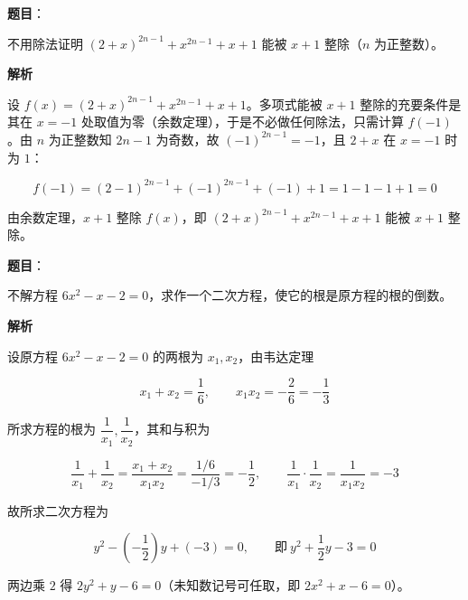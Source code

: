 

\begin{answer}

\textbf{题目}：

不用除法证明 $(2+x)^{2n-1}+x^{2n-1}+x+1$ 能被 $x+1$ 整除（$n$ 为正整数）。

\textbf{解析}

设 $f(x)=(2+x)^{2n-1}+x^{2n-1}+x+1$。多项式能被 $x+1$ 整除的充要条件是其在 $x=-1$ 处取值为零（余数定理），于是不必做任何除法，只需计算 $f(-1)$。由 $n$ 为正整数知 $2n-1$ 为奇数，故 $(-1)^{2n-1}=-1$，且 $2+x$ 在 $x=-1$ 时为 $1$：

\nopagebreak[4]
\[
f(-1)=(2-1)^{2n-1}+(-1)^{2n-1}+(-1)+1=1-1-1+1=0
\]

由余数定理，$x+1$ 整除 $f(x)$，即 $(2+x)^{2n-1}+x^{2n-1}+x+1$ 能被 $x+1$ 整除。


\end{answer}
\begin{answer}

\textbf{题目}：

不解方程 $6x^2-x-2=0$，求作一个二次方程，使它的根是原方程的根的倒数。

\textbf{解析}

设原方程 $6x^2-x-2=0$ 的两根为 $x_1,x_2$，由韦达定理

\nopagebreak[4]
\[
x_1+x_2=\frac{1}{6},\qquad x_1x_2=-\frac{2}{6}=-\frac{1}{3}
\]

所求方程的根为 $\dfrac{1}{x_1},\dfrac{1}{x_2}$，其和与积为

\nopagebreak[4]
\[
\frac{1}{x_1}+\frac{1}{x_2}=\frac{x_1+x_2}{x_1x_2}=\frac{1/6}{-1/3}=-\frac{1}{2},\qquad
\frac{1}{x_1}\cdot\frac{1}{x_2}=\frac{1}{x_1x_2}=-3
\]

故所求二次方程为

\nopagebreak[4]
\[
y^2-\left(-\frac12\right)y+(-3)=0,\qquad\text{即}\ y^2+\frac12y-3=0
\]

两边乘 $2$ 得 $2y^2+y-6=0$（未知数记号可任取，即 $2x^2+x-6=0$）。


\end{answer}
